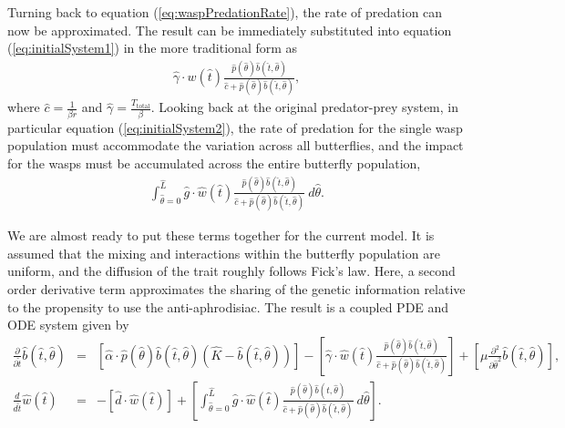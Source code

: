 \documentclass[12pt]{article}
\newcommand{\origB}{\hat{b}}
\newcommand{\origW}{\hat{w}}
\newcommand{\origAlpha}{\hat{\alpha}}
\newcommand{\origK}{\hat{K}}
\newcommand{\origGamma}{\hat{\gamma}}
\newcommand{\origC}{\hat{c}}
\newcommand{\origD}{\hat{d}}
\newcommand{\origG}{\hat{g}}
\newcommand{\origL}{\hat{L}}
\newcommand{\origP}[1]{\hat{p}(#1)}
\newcommand{\origTheta}{\hat{\theta}}
\newcommand{\origT}{\hat{t}}
\begin{document}
Turning back to equation (\ref{eq:waspPredationRate}), the rate of
predation can now be approximated.  The result can be immediately
substituted into equation (\ref{eq:initialSystem1}) in the more
traditional form as
\begin{eqnarray}
  \label{eq:butterflyPredationRate}
  \origGamma \cdot w(\origT) \frac{\origP{\origTheta} \origB(\origT,\origTheta) }{\origC +  \origP{\origTheta} \origB(\origT,\origTheta)},
\end{eqnarray}
where $\origC=\frac{1}{\beta r}$ and
$\origGamma=\frac{T_{\mathrm{total}}}{\beta}$.  Looking back at the
original predator-prey system, in particular equation
(\ref{eq:initialSystem2}), the rate of predation for the single wasp
population must accommodate the variation across all butterflies, and
the impact for the wasps must be accumulated across the entire
butterfly population,
\begin{eqnarray}
  \label{eq:totalWaspPredationRate}
  \int^{\origL}_{\origTheta=0} \origG \cdot \origW(\origT) \frac{\origP{\origTheta} \origB(\origT,\origTheta) }{\origC + \origP{\origTheta} \origB(\origT,\origTheta)} ~ d\origTheta.
\end{eqnarray}

We are almost ready to put these terms together for the current
model. It is assumed that the mixing and interactions within the
butterfly population are uniform, and the diffusion of the trait
roughly follows Fick's law\cite{logan2006applied}. Here, a second
order derivative term approximates the sharing of the genetic
information relative to the propensity to use the
anti-aphrodisiac. The result is a coupled PDE and ODE system given by
\begin{eqnarray}
  \label{eq:odePDE1}
  \frac{\partial}{\partial \origT} \origB(\origT,\origTheta) & = &
      \left[ \origAlpha \cdot \origP{\origTheta} \origB(\origT,\origTheta) (\origK - \origB(\origT,\origTheta)) \right]
      - \left[ \origGamma \cdot \origW(\origT) \frac{\origP{\origTheta} \origB(\origT,\origTheta)}{\origC+\origP{\origTheta}\origB(\origT,\origTheta)} \right]
      + \left[ \mu \frac{\partial^2}{\partial \origTheta^2} \origB(\origT,\origTheta)\right], \\
  \label{eq:odePDE2}
  \frac{d}{d\origT} \origW(\origT) & = & - \left[ \origD \cdot \origW(\origT) \right]  +
       \left[
          \int^{\origL}_{\origTheta=0} \origG \cdot \origW(\origT) \frac{\origP{\origTheta} \origB(\origT,\origTheta) }{\origC + \origP{\origTheta} \origB(\origT,\origTheta)} ~ d\origTheta
       \right].
\end{eqnarray}
\end{document}
